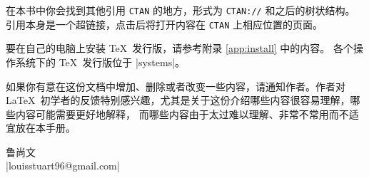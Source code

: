 在本书中你会找到其他引用 \texttt{CTAN} 的地方，形式为 \texttt{CTAN://} 和之后的树状结构。
引用本身是一个超链接，点击后将打开内容在 \texttt{CTAN} 上相应位置的页面。

要在自己的电脑上安装 \TeX\ 发行版，请参考附录 \ref{app:install} 中的内容。
各个操作系统下的 \TeX\ 发行版位于 \CTAN|systems|。

\bigskip
如果你有意在这份文档中增加、删除或者改变一些内容，请通知作者。作者对 \LaTeX\ 
初学者的反馈特别感兴趣，尤其是关于这份介绍哪些内容很容易理解，哪些内容可能需要更好地解释，
而哪些内容由于太过难以理解、非常不常用而不适宜放在本手册。

\bigskip
\begin{flushright}
鲁尚文 \\
\mailto|louisstuart96@gmail.com|
\end{flushright}

\vfill

\smallskip

\endinput